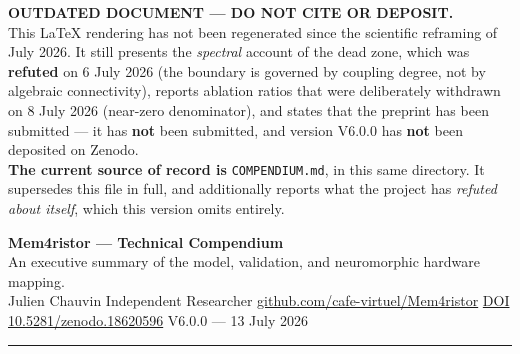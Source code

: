 \documentclass[11pt, a4paper]{article}
\begin{document}
\begin{mdframed}[linecolor=negative, linewidth=3pt, backgroundcolor=white,
                 topline=true, bottomline=true, rightline=false, leftline=true]
{\bfseries\color{negative} OUTDATED DOCUMENT --- DO NOT CITE OR DEPOSIT.}\\[0.3em]
{\small This \LaTeX{} rendering has not been regenerated since the scientific
reframing of July 2026. It still presents the \emph{spectral} account of the dead
zone, which was \textbf{refuted} on 6 July 2026 (the boundary is governed by
coupling degree, not by algebraic connectivity), reports ablation ratios that were
deliberately withdrawn on 8 July 2026 (near-zero denominator), and states that the
preprint has been submitted --- it has \textbf{not} been submitted, and version
V6.0.0 has \textbf{not} been deposited on Zenodo.\\[0.4em]
\textbf{The current source of record is} \texttt{COMPENDIUM.md}, in this same
directory. It supersedes this file in full, and additionally reports what the
project has \emph{refuted about itself}, which this version omits entirely.}
\end{mdframed}
\vspace{0.8em}

\begin{center}
  {\LARGE\bfseries\color{accent} Mem4ristor — Technical Compendium}\\[0.4em]
  {\large An executive summary of the model, validation, and neuromorphic hardware mapping.}\\[0.6em]
  {\small\color{muted}
    Julien Chauvin \quad \textbar \quad
    Independent Researcher \quad \textbar \quad
    \href{https://github.com/cafe-virtuel/Mem4ristor}{github.com/cafe-virtuel/Mem4ristor} \quad \textbar \quad
    \href{https://doi.org/10.5281/zenodo.18620596}{DOI 10.5281/zenodo.18620596} \quad \textbar \quad
    V6.0.0 — 13 July 2026
  }
\end{center}

\vspace{0.3em}
\color{rulecol}\rule{\linewidth}{1pt}\color{black}
\vspace{0.5em}

\end{document}
